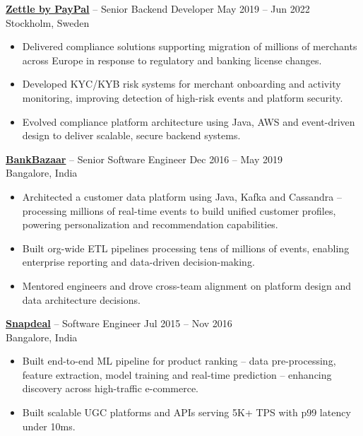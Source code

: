 \documentclass[9pt,a4paper]{article}
\begin{document}
\vspace{1pt}
\textbf{\href{https://www.zettle.com/gb}{Zettle by PayPal}} -- Senior Backend Developer \hfill May 2019 -- Jun 2022\\
{\small\color{mid} Stockholm, Sweden}
\begin{itemize}
  \item Delivered compliance solutions supporting migration of millions of merchants across Europe in response to regulatory and banking license changes.
  \item Developed KYC/KYB risk systems for merchant onboarding and activity monitoring, improving detection of high-risk events and platform security.
  \item Evolved compliance platform architecture using Java, AWS and event-driven design to deliver scalable, secure backend systems.
\end{itemize}

\vspace{1pt}
\textbf{\href{https://www.bankbazaar.com}{BankBazaar}} -- Senior Software Engineer \hfill Dec 2016 -- May 2019\\
{\small\color{mid} Bangalore, India}
\begin{itemize}
  \item Architected a customer data platform using Java, Kafka and Cassandra -- processing millions of real-time events to build unified customer profiles, powering personalization and recommendation capabilities.
  \item Built org-wide ETL pipelines processing tens of millions of events, enabling enterprise reporting and data-driven decision-making.
  \item Mentored engineers and drove cross-team alignment on platform design and data architecture decisions.
\end{itemize}

\vspace{1pt}
\textbf{\href{https://www.snapdeal.com}{Snapdeal}} -- Software Engineer \hfill Jul 2015 -- Nov 2016\\
{\small\color{mid} Bangalore, India}
\begin{itemize}
  \item Built end-to-end ML pipeline for product ranking -- data pre-processing, feature extraction, model training and real-time prediction -- enhancing discovery across high-traffic e-commerce.
  \item Built scalable UGC platforms and APIs serving 5K+ TPS with p99 latency under 10ms.
\end{itemize}
\end{document}
